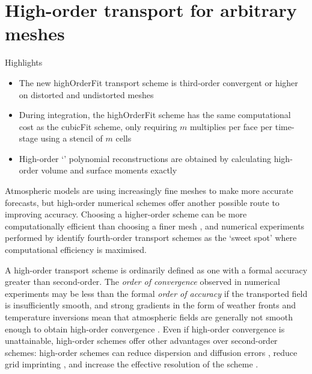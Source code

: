 \chapter{High-order transport for arbitrary meshes}
\label{ch:highOrder}

\begin{highlights}
{\Large Highlights}
\begin{itemize}
	\item The new highOrderFit transport scheme is third-order convergent or higher on distorted and undistorted meshes
	\item During integration, the highOrderFit scheme has the same computational cost as the cubicFit scheme, only requiring $m$ multiplies per face per time-stage using a stencil of $m$ cells
	\item High-order `\kexact' polynomial reconstructions are obtained by calculating high-order volume and surface moments exactly
\end{itemize}
\end{highlights}

Atmospheric models are using increasingly fine meshes to make more accurate forecasts, but high-order numerical schemes offer another possible route to improving accuracy.
Choosing a higher-order scheme can be more computationally efficient than choosing a finer mesh \citep{waruszewski2018}, and numerical experiments performed by \citet{ullrich2014} identify fourth-order transport schemes as the `sweet spot'  where computational efficiency is maximised.

A high-order transport scheme is ordinarily defined as one with a formal accuracy greater than second-order.
The \emph{order of convergence} observed in numerical experiments may be less than the formal \emph{order of accuracy} if the transported field is insufficiently smooth, and strong gradients in the form of weather fronts and temperature inversions mean that atmospheric fields are generally not smooth enough to obtain high-order convergence \citep{holdaway2008}.
Even if high-order convergence is unattainable, high-order schemes offer other advantages over second-order schemes: high-order schemes can reduce dispersion and diffusion errors \citep{ullrich-jablonowski2012,waruszewski2018}, reduce grid imprinting \citep{mccorquodale2015}, and increase the effective resolution of the scheme \citep{ullrich2014}.

